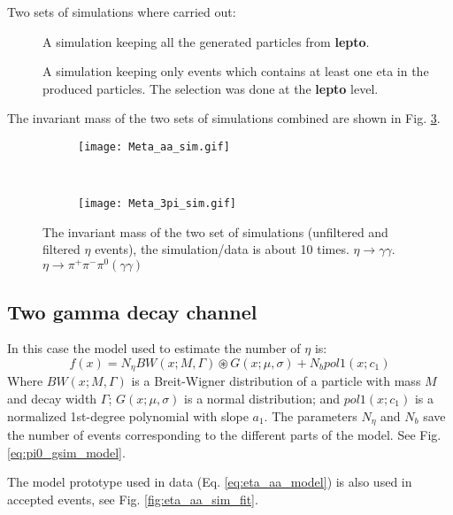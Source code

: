 Two sets of simulations where carried out:
\begin{description}
\item[] A simulation keeping all the generated particles from \textbf{lepto}. 
\item[] A simulation keeping only events which contains at least one eta in the produced particles. The selection was done at the \textbf{lepto} level.
\end{description}
%
The invariant mass of the two sets of simulations combined are shown in Fig. \ref{fig:M_sim}.
\begin{figure}[!ht]
\centering
\begin{subfigure}[b]{0.45\textwidth}
\texttt{[image: Meta\_aa\_sim.gif]}
\caption{}
\label{fig:M_aa_sim}
\end{subfigure}
~
\begin{subfigure}[b]{0.45\textwidth}
\texttt{[image: Meta\_3pi\_sim.gif]}
\caption{}
\label{fig:M_3pi_sim}
\end{subfigure}
\caption{The invariant mass of the two set of simulations (unfiltered and filtered $\eta$ events), the simulation/data is about 10 times. \protect{} $\eta \rightarrow \gamma\gamma$. \protect{} $\eta \rightarrow \pi^{+} \pi^{-}\pi^{0}(\gamma\gamma)$ }
\label{fig:M_sim}
\end{figure}
\clearpage
\subsection{Two gamma decay channel}
\label{s:eta_aa_AC}
In this case the model used to estimate the number of $\eta$ is:
\begin{equation}
f(x) = N_{\eta}BW(x;M,\Gamma) \circledast G(x;\mu,\sigma) + N_b pol1(x;c_1)
\label{eq:pi0_gsim_model}
\end{equation}
Where $BW(x;M,\Gamma)$ is a Breit-Wigner distribution of a particle with mass $M$ and decay width $\Gamma$; $G(x;\mu,\sigma)$ is a normal distribution; and $pol1(x;c_1)$ is a normalized 1st-degree polynomial with slope $a_1$. The parameters $N_{\eta}$ and  $N_b$ save the number of events corresponding to the different parts of the model. See Fig. \ref{eq:pi0_gsim_model}.

The model prototype used in data (Eq. \eqref{eq:eta_aa_model}) is also used in accepted events, see Fig. \ref{fig:eta_aa_sim_fit}.

